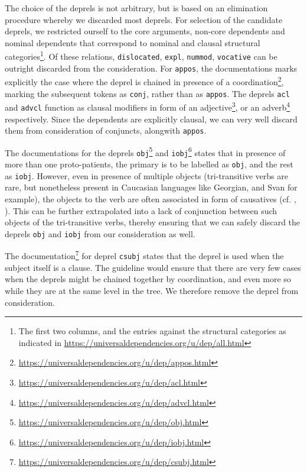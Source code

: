 The choice of the deprels is not arbitrary, but is based on an elimination procedure whereby we discarded most deprels. For selection of the candidate deprels, we restricted ourself to the core arguments, non-core dependents and nominal dependents that correspond to nominal and clausal structural categories\footnote{The first two columns, and the entries against the structural categories as indicated in \url{https://universaldependencies.org/u/dep/all.html}}. Of these relations, \verb|dislocated|, \verb|expl|, \verb|nummod|, \verb|vocative| can be outright discarded from the consideration. For \verb|appos|, the documentations marks explicitly the case where the deprel is chained in presence of a coordination\footnote{\url{https://universaldependencies.org/u/dep/appos.html}}, marking the subsequent tokens as \verb|conj|, rather than as \verb|appos|. The deprels \verb|acl| and \verb|advcl| function as clausal modifiers in form of an adjective\footnote{\url{https://universaldependencies.org/u/dep/acl.html}}, or an adverb\footnote{\url{https://universaldependencies.org/u/dep/advcl.html}} respectively. Since the dependents are explicitly clausal, we can very well discard them from consideration of conjuncts, alongwith \verb|appos|.

The documentations for the deprels \verb|obj|\footnote{\url{https://universaldependencies.org/u/dep/obj.html}} and \verb|iobj|\footnote{\url{https://universaldependencies.org/u/dep/iobj.html}} states that in presence of more than one proto-patients, the primary is to be labelled as \verb|obj|, and the rest as \verb|iobj|. However, even in presence of multiple objects (tri-transitive verbs are rare, but nonetheless present in Caucasian languages like Georgian, and Svan for example), the objects to the verb are often associated in form of causatives (cf. \cite[p.~39]{chirikba}, \cite[p.~43]{boeder}). This can be further extrapolated into a lack of conjunction between such objects of the tri-transitive verbs, thereby ensuring that we can safely discard the deprels \verb|obj| and \verb|iobj| from our consideration as well. 

The documentation\footnote{\url{https://universaldependencies.org/u/dep/csubj.html}} for deprel \texttt{csubj} states that the deprel is used when the subject itself is a clause. The guideline would ensure that there are very few cases when the deprels might be chained together by coordination, and even more so while they are at the same level in the tree. We therefore remove the deprel from consideration. 


